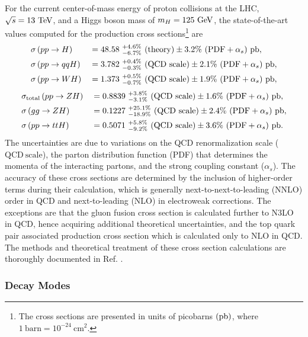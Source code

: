 For the current center-of-mass energy of proton collisions at the LHC, $\sqrt{s} = 13\ \mathrm{TeV}$, and a Higgs boson mass of $m_{H} = 125\ \mathrm{GeV}$, the state-of-the-art values computed for the production cross sections\footnote{The cross sections are presented in units of picobarns $(\mathrm{pb})$, where $1\ \mathrm{barn} = 10^{-24}\ \mathrm{cm}^{2}$.} are
\begin{alignat*}{2}
  &\sigma\left( pp \rightarrow H \right) &&= 48.58\ {}_{-6.7\%}^{+4.6\%} \ (\mathrm{theory}) \pm 3.2\%\ (\mathrm{PDF} + \alpha_{s})\ \mathrm{pb}, \\
  &\sigma\left( pp \rightarrow qqH \right) &&= 3.782\ {}_{-0.3\%}^{+0.4\%} \ (\mathrm{QCD\ scale}) \pm 2.1\%\ (\mathrm{PDF} + \alpha_{s})\ \mathrm{pb}, \\
  &\sigma\left( pp \rightarrow WH \right) &&= 1.373\ {}_{-0.7\%}^{+0.5\%} \ (\mathrm{QCD\ scale}) \pm 1.9\%\ (\mathrm{PDF} + \alpha_{s})\ \mathrm{pb},
\end{alignat*}
\begin{alignat*}{2}
  &\sigma_{\mathrm{total}}\left( pp \rightarrow ZH \right) &&= 0.8839\ {}_{-3.1\%}^{+3.8\%} \ (\mathrm{QCD\ scale}) \pm 1.6\%\ (\mathrm{PDF} + \alpha_{s})\ \mathrm{pb}, \\
  &\sigma\left( gg \rightarrow ZH \right) &&= 0.1227\ {}_{-18.9\%}^{+25.1\%} \ (\mathrm{QCD\ scale}) \pm 2.4\%\ (\mathrm{PDF} + \alpha_{s})\ \mathrm{pb}, \\
  &\sigma\left( pp \rightarrow ttH \right) &&= 0.5071\ {}_{-9.2\%}^{+5.8\%} \ (\mathrm{QCD\ scale}) \pm 3.6\%\ (\mathrm{PDF} + \alpha_{s})\ \mathrm{pb}.
\end{alignat*}
The uncertainties are due to variations on the QCD renormalization scale ($\mathrm{QCD\ scale}$), the parton distribution function (PDF) that determines the momenta of the interacting partons, and the strong coupling constant ($\alpha_{s}$). The accuracy of these cross sections are determined by the inclusion of higher-order terms during their calculation, which is generally next-to-next-to-leading (NNLO) order in QCD and next-to-leading (NLO) in electroweak corrections. The exceptions are that the gluon fusion cross section is calculated further to N3LO in QCD, hence acquiring additional theoretical uncertainties, and the top quark pair associated production cross section which is calculated only to NLO in QCD. The methods and theoretical treatment of these cross section calculations are thoroughly documented in Ref. \cite{CERNYR4}.

\subsubsection{Decay Modes}

